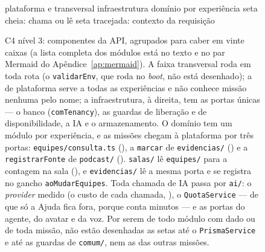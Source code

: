 \begin{figure}[H]
{\begin{tikzpicture}
\end{tikzpicture}}
\begin{legendadiag}
 plataforma e transversal \quad
{} infraestrutura \quad
{} domínio por experiência \quad
seta cheia: chama ou lê \quad seta tracejada: contexto da requisição
\end{legendadiag}
\caption[C4 nível 3 --- componentes da API]{C4 nível 3: componentes da API,
  agrupados para caber em vinte caixas (a lista completa dos módulos está no
  texto e no par Mermaid do Apêndice~\ref{ap:mermaid}). A faixa transversal roda
  em toda rota (o \texttt{validarEnv}, que roda no \emph{boot}, não está
  desenhado); a de plataforma serve a todas as experiências e não conhece missão
  nenhuma pelo nome; a infraestrutura, à direita, tem as portas únicas --- o banco
  (\texttt{comTenancy}), as guardas de liberação e de disponibilidade, a IA e o
  armazenamento. O domínio tem um módulo por experiência, e as missões chegam à
  plataforma por três portas: \texttt{equipes/consulta.ts} (), a
  \texttt{marcar} de \texttt{evidencias/} () e a
  \texttt{registrarFonte} de \texttt{podcast/} ().
  \texttt{salas/} lê \texttt{equipes/} para a contagem na sala (), e
  \texttt{evidencias/} lê a mesma porta e se registra no gancho
  \texttt{aoMudarEquipes}. Toda chamada de IA passa por \texttt{ai/}: o
  \emph{provider} medido (o custo de cada chamada, ), o
  \texttt{QuotaService} --- de que só a Ajuda fica fora, porque conta minutos ---
  e as portas do agente, do avatar e da voz. Por serem de todo módulo com dado ou
  de toda missão, não estão desenhadas as setas até o \texttt{PrismaService} e
  até as guardas de \texttt{comum/}, nem as das outras missões.}
\label{fig:c4l3api}
\end{figure}

